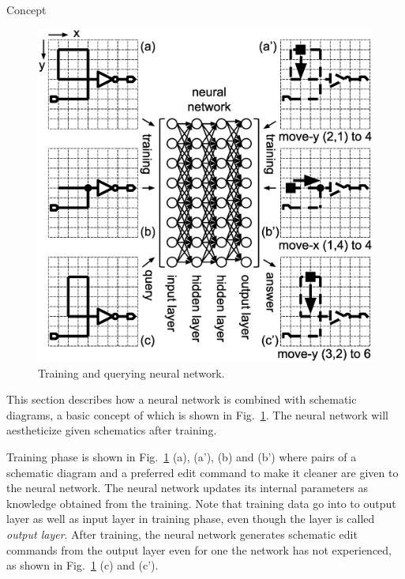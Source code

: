 \documentclass[twocolumn]{article}
\makeatletter
\def\section{\@startsection {section}{1}{\z@}{20pt plus 2pt minus 2pt}
{8pt plus 2pt minus 2pt}{\centering\normalsize\sc
\edef\@svsec{\thesection.\ }}}
\def\thesection{\Roman{section}}
\makeatother
\begin{document}
\section{Concept}

\begin{figure}[!tp]
 \begin{center}
  \begin{minipage}{\hsize}
   \includegraphics[width=\hsize]{fig/nn_schem_06.eps}
   \caption{Training and querying neural network.}
   \label{fig:nn_schem}
  \end{minipage}
 \end{center}
\end{figure}

This section describes how a neural network is
combined with schematic diagrams,
a basic concept of which is shown in Fig.\ \ref{fig:nn_schem}.
The neural network will aestheticize given schematics after training.

Training phase is shown in Fig.\ \ref{fig:nn_schem} (a), (a'), (b) and (b')
where pairs of a schematic diagram and a preferred edit command
to make it cleaner are given to the neural network.
The neural network updates its internal parameters as knowledge obtained
from the training.
Note that training data go into to output layer
as well as input layer in training phase,
even though the layer is called {\it output layer}.
After training, the neural network generates schematic edit commands
from the output layer even for one the network has not experienced,
as shown in Fig.\ \ref{fig:nn_schem} (c) and (c').
\end{document}
